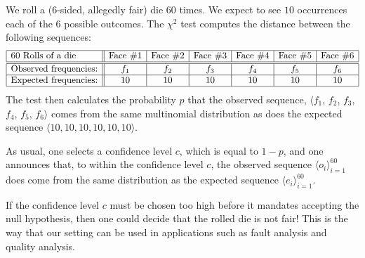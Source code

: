 We roll a ($6$-sided, allegedly fair) die $60$ times.  We expect to
see $10$ occurrences each of the $6$ possible outcomes.  The $\chi^2$ test computes the distance between the following sequences:
\[ \begin{array}{|l||c|c|c|c|c|c|}
\hline
\mbox{60 Rolls of a die}  &
\mbox{Face } \#1 &
\mbox{Face } \#2 &
\mbox{Face } \#3 &
\mbox{Face } \#4 &
\mbox{Face } \#5 &
\mbox{Face } \#6 \\
\hline \hline 
\mbox{Observed frequencies:}
  & f_1 & f_2 & f_3 & f_4 & f_5 & f_6 \\
\hline
\mbox{Expected frequencies:}
  & 10 & 10 & 10 & 10 & 10 & 10 \\
\hline
\end{array}
\]
The test then calculates the probability $p$ that the observed sequence, $\langle f_1$, $f_2$, $f_3$, $f_4$, $f_5$, $f_6 \rangle$ comes from the same multinomial distribution as does the expected sequence $\langle 10, 10, 10, 10, 10, 10 \rangle$. 

\smallskip

As usual, one selects a confidence level $c$, which is equal to $1-p$, and one announces that, to within the confidence level $c$, the observed sequence $\langle o_i \rangle_{i=1}^{60}$ does come from the same distribution as the expected sequence $\langle e_i \rangle_{i=1}^{60}$.

\smallskip

If the confidence level $c$ must be chosen too high before it mandates accepting the null hypothesis, then one could decide that the rolled die is not fair!  This is the way that our setting can be used in applications such as fault analysis and quality analysis.


